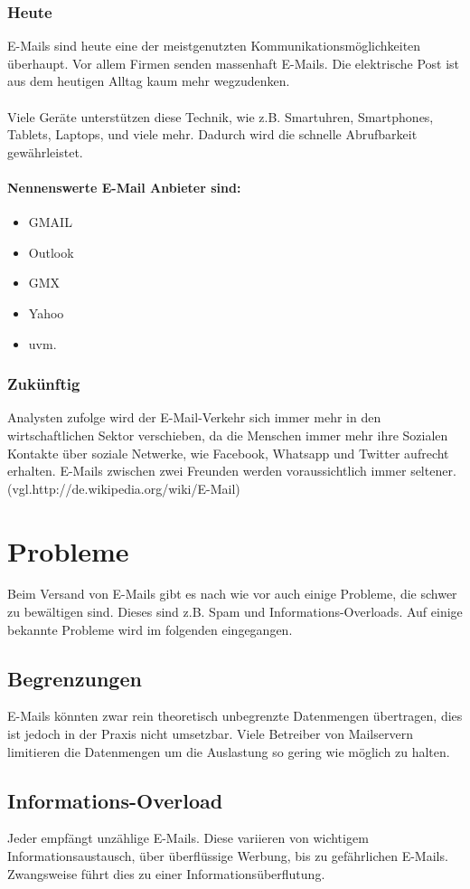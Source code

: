\documentclass[12pt,a4paper]{report}
\begin{document}
\begin{onehalfspace}
\subsubsection{Heute}
E-Mails sind heute eine der meistgenutzten Kommunikationsmöglichkeiten überhaupt. Vor allem Firmen senden massenhaft E-Mails. Die elektrische Post ist aus dem heutigen Alltag kaum mehr wegzudenken.\\\\
Viele Geräte unterstützen diese Technik, wie z.B. Smartuhren, Smartphones, Tablets, Laptops, und viele mehr. Dadurch wird die schnelle Abrufbarkeit gewährleistet.
\paragraph{Nennenswerte E-Mail Anbieter sind:}
\begin{itemize}
\item GMAIL
\item Outlook
\item GMX
\item Yahoo
\item uvm.
\end{itemize} 
\subsubsection{Zukünftig}
Analysten zufolge wird der E-Mail-Verkehr sich immer mehr in den wirtschaftlichen Sektor verschieben, da die Menschen immer mehr ihre Sozialen Kontakte über soziale Netwerke, wie Facebook, Whatsapp und Twitter aufrecht erhalten. E-Mails zwischen zwei Freunden werden voraussichtlich immer seltener. (vgl.http://de.wikipedia.org/wiki/E-Mail)
\section{Probleme}
Beim Versand von E-Mails gibt es nach wie vor auch einige Probleme, die schwer zu bewältigen sind. Dieses sind z.B. Spam und Informations-Overloads. Auf einige bekannte Probleme wird im folgenden eingegangen.
\subsection{Begrenzungen}
E-Mails könnten zwar rein theoretisch unbegrenzte Datenmengen übertragen, dies ist jedoch in der Praxis nicht umsetzbar. Viele Betreiber von Mailservern limitieren die Datenmengen um die Auslastung so gering wie möglich zu halten. 
\subsection{Informations-Overload}
Jeder empfängt unzählige E-Mails. Diese variieren von wichtigem Informationsaustausch, über überflüssige Werbung, bis zu gefährlichen E-Mails. Zwangsweise führt dies zu einer Informationsüberflutung. 

\end{onehalfspace}
\end{document}
